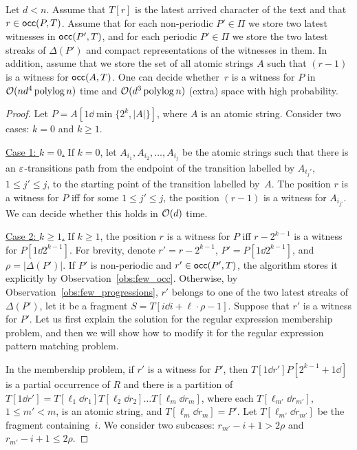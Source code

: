 \begin{lemma}\label{lm:restore_witnesses}
Let $d<n$. Assume that $T[r]$ is the latest arrived character of the text and  that $r \in \mathsf{occ}(P,T)$. Assume that for each non-periodic $P'\in \Pi$ we store two latest witnesses in $\mathsf{occ}(P',T)$, and for each periodic $P' \in \Pi$ we store the two latest streaks of $\Delta(P')$ and compact representations of the witnesses in them. In addition, assume that we store the set of all atomic strings $A$ such that $(r-1)$ is a witness for $\mathsf{occ}(A,T)$. One can decide whether~$r$ is a witness for $P$ in $\mathcal{O}(nd^4 \operatorname{polylog} n)$ time and $\mathcal{O}(d^3\operatorname{polylog} n)$ (extra) space with high probability.
\end{lemma} 
\begin{proof}
Let $P = A[1 \dd \min\{2^k,|A|\}]$, where $A$ is an atomic string. Consider two cases: $k = 0$ and $k \ge 1$.

\underline{Case 1: $k = 0$.} If $k = 0$, let  $A_{i_1}, A_{i_2}, \ldots, A_{i_j}$ be the atomic strings such that there is an $\varepsilon$-transitions path from the endpoint of the transition labelled by $A_{i_j'}$, $1 \le j' \le j$, to the starting point of the transition labelled by~$A$. The position $r$ is a witness for $P$ iff for some $1 \le j' \le j$, the position $(r-1)$ is a witness for $A_{i_{j'}}$. We can decide whether this holds in $\mathcal{O}(d)$ time.

\underline{Case 2: $k \ge 1$.} If $k \ge 1$, the position $r$ is a witness for $P$ iff $r-2^{k-1}$ is a witness for $P[1\dd 2^{k-1}]$. For brevity, denote $r' = r-2^{k-1}$, $P' = P[1\dd 2^{k-1}]$, and $\rho = |\Delta(P')|$. If $P'$ is non-periodic and $r' \in \mathsf{occ}(P',T)$, the algorithm stores it explicitly by Observation~\ref{obs:few_occ}.
Otherwise, by Observation~\ref{obs:few_progressions}, $r'$ belongs to one of the two latest streaks of $\Delta(P')$, let it be a fragment $S = T[i \dd i+ \ell \cdot \rho-1]$. Suppose that $r'$ is a witness for $P'$. Let us first explain the solution for the regular expression membership problem, and then we will show how to modify it for the regular expression pattern matching problem. 

In the membership problem, if $r'$ is a witness for $P'$, then $T[1\dd r'] P[2^{k-1}+1\dd]$ is a partial occurrence of $R$ and there is a partition of $T[1 \dd r'] = T[\ell_1 \dd r_1] T[\ell_2 \dd r_2] \ldots T[\ell_m \dd r_m]$, where each $T[\ell_{m'} \dd r_{m'}]$, $1 \le m' < m$, is an atomic string, and $T[\ell_m \dd r_m] = P'$. Let $T[\ell_{m'} \dd r_{m'}]$ be the fragment containing~$i$. We consider two subcases: $r_{m'}-i+1 > 2\rho$ and $r_{m'}-i+1 \le 2\rho$. 


\end{proof}
